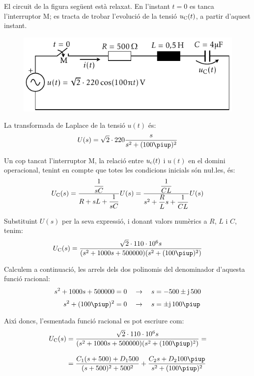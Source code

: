 \begin{exemple}
El circuit de la figura seg\"{u}ent est\`{a} relaxat. En l'instant $t=0$ es
tanca l'interruptor M; es tracta de trobar l'evoluci\'{o} de la tensi\'{o}
$u_\mathrm{C}(t)$, a partir d'aquest instant.
\begin{figure}[h]
\centering
    \includegraphics{Imatges/Cap-Laplace-Exemple4-Circuit.pdf}
\end{figure}


La transformada de Laplace de la tensi\'{o} $u(t)$ \'{e}s:
\[
    U(s) = \sqrt{2}\cdot 220 \frac{s}{s^2 + (100\piup)^2}
\]

\break
Un cop tancat l'interruptor M, la relaci\'{o} entre $u_\mathrm{c}(t)$ i
$u(t)$ en el domini operacional, tenint en compte que totes les
condicions inicials s\'{o}n nu{\l.l}es, \'{e}s:
\[
    U_\mathrm{C}(s) = \frac{\dfrac{1}{sC}}{R+ sL +\dfrac{1}{sC}} U(s)=
    \frac{\dfrac{1}{CL}}{s^2 + \dfrac{R}{L}s +\dfrac{1}{CL}} U(s)
\]

Substituint $U(s)$ per la seva expressi\'{o}, i donant valors num\`{e}rics a
$R$, $L$ i $C$, tenim:
\[
    U\ped{C}(s) = \frac{\sqrt{2}\cdot 110\cdot 10^6 s}{(s^2 + 1000 s + 500000)(s^2 + (100\piup)^2)}
\]

Calculem a continuaci\'{o}, les arrels dels dos polinomis  del
denominador d'aquesta funci\'{o} racional:
\begin{align*}
    s^2 + 1000 s + 500000 &= 0 \quad\rightarrow\quad s = -500
    \pm\ju\,500 \\[0.5ex]
    s^2 + (100\piup)^2 &= 0 \quad\rightarrow\quad s = \pm\ju\,100\piup
\end{align*}

Aix\'{\i} doncs, l'esmentada funci\'{o} racional es pot escriure com:
\[\begin{split}
U\ped{C}(s) &= \frac{\sqrt{2}\cdot 110\cdot 10^6 s}{(s^2 + 1000 s +
500000)(s^2 + (100\piup)^2)}  = \\[2ex] &= \frac{C_1 (s+500) + D_1
500}{(s+500)^2+500^2} + \frac{C_2 s + D_2 100 \piup}{s^2 +(100\piup)^2}
\end{split}\]



\end{exemple}
